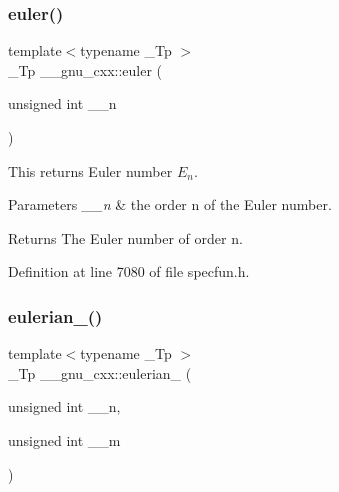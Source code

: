 \subsubsection{\texorpdfstring{euler()}{euler()}}
{\footnotesize\ttfamily template$<$typename \+\_\+\+Tp $>$ \\
\+\_\+\+Tp \+\_\+\+\_\+gnu\+\_\+cxx\+::euler (\begin{DoxyParamCaption}\item[{unsigned int}]{\+\_\+\+\_\+n }\end{DoxyParamCaption})\hspace{0.3cm}{\ttfamily [inline]}}



This returns Euler number $ E_n $. 


\begin{DoxyParams}{Parameters}
{\em \+\_\+\+\_\+n} & the order n of the Euler number. \\
\hline
\end{DoxyParams}
\begin{DoxyReturn}{Returns}
The Euler number of order n. 
\end{DoxyReturn}


Definition at line 7080 of file specfun.\+h.

\mbox{\label{group__gnu__math__spec__func_gadfd8810a97655d2cdd1b0e3af68a79d3}} 
\subsubsection{\texorpdfstring{eulerian\+\_()}{eulerian\_1()}\hspace{0.1cm}{\footnotesize\ttfamily [1/2]}}
{\footnotesize\ttfamily template$<$typename \+\_\+\+Tp $>$ \\
\+\_\+\+Tp \+\_\+\+\_\+gnu\+\_\+cxx\+::eulerian\+\_ (\begin{DoxyParamCaption}\item[{unsigned int}]{\+\_\+\+\_\+n,  }\item[{unsigned int}]{\+\_\+\+\_\+m }\end{DoxyParamCaption})\hspace{0.3cm}{\ttfamily [inline]}}

